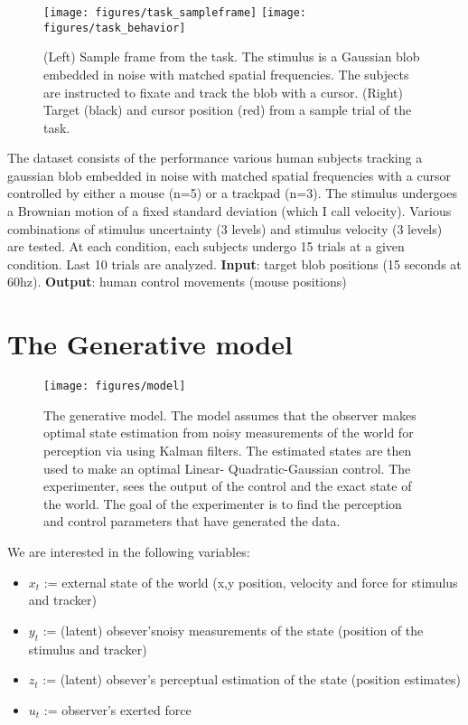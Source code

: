 \documentclass[11pt, reqno]{article}
\numberwithin{equation}{section}
\begin{document}
\begin{figure}
\centering
\texttt{[image: figures/task\_sampleframe]}
\texttt{[image: figures/task\_behavior]}
\caption{(Left) Sample frame from the task. The stimulus is a Gaussian blob embedded in noise with matched spatial frequencies. The subjects are instructed to fixate and track the blob with a cursor. (Right) Target (black) and cursor position (red) from a sample trial of the task.}
\end{figure}

The dataset consists of the performance various human subjects tracking a gaussian blob embedded in noise with matched spatial frequencies with a cursor controlled by either a mouse (n=5) or a trackpad (n=3). The stimulus undergoes a Brownian motion of a fixed standard deviation (which I call velocity). Various combinations of stimulus uncertainty (3 levels) and stimulus velocity (3 levels) are tested. At each condition, each subjects undergo 15 trials at a given condition. Last 10 trials are analyzed.  \textbf{Input}: target blob positions (15 seconds at 60hz). \textbf{Output}: human control movements (mouse positions)


\section{The Generative model}

\begin{figure}
\centering
\texttt{[image: figures/model]}
\caption{The generative model.  The model assumes that the observer makes optimal state estimation from noisy measurements of the world for perception via using Kalman filters.  The estimated states are then used to make an optimal Linear- Quadratic-Gaussian control.  The experimenter,  sees the output of the control and the exact state of the world.  The goal of the experimenter is to find the perception and control parameters that have generated the data.}
\end{figure}

We are interested in the following variables: 
\begin{itemize}
\item $x_t$ := external state of the world (x,y position, velocity and force for stimulus and tracker)
\item $y_t$ := (latent) obsever'snoisy measurements of the state (position of the stimulus and tracker)
\item $z_t$ := (latent) obsever's perceptual estimation of the state (position estimates)
\item $u_t$ := observer's exerted force
\end{itemize}
\end{document}
